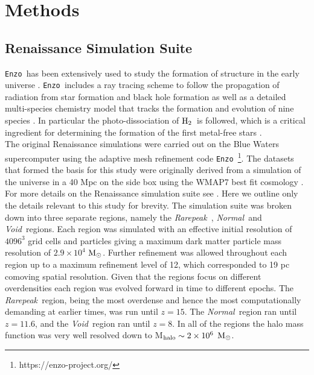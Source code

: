 \documentclass[graphics, twocolumn, usenatbib]{mn2e}
\newcommand{\enzo}{\texttt{Enzo~}}
\newcommand{\msolarc} {$\rm{M_{\odot}}$}
\newcommand{\molH} {$\rm{H_2}$~}
\newcommand{\rarepeak} {\textit{Rarepeak~}}
\newcommand{\normal} {\textit{Normal~}}
\newcommand{\void} {\textit{Void~}}
\begin{document}
\section{Methods} \label{Sec:Methods}


\subsection{Renaissance Simulation Suite} \label{Sec:Renaissance}
\enzo has been extensively used to study the formation of structure in the early universe
\citep{Abel_2002, OShea_2005b, Turk_2012, Wise_2012b, Wise_2014, Regan_2015, Regan_2017}.
\enzo includes a ray tracing scheme to follow the propagation of radiation from
star formation and black hole formation \citep{WiseAbel_2011} as well as a detailed multi-species
chemistry model that tracks the formation and evolution of nine species \citep{Anninos_1997,
  Abel_1997}. In particular the photo-dissociation of \molH is followed, which is a critical
ingredient for determining the formation of the first metal-free stars \citep{Abel_2000}.\\
\indent The original Renaissance simulations were carried out on the Blue Waters supercomputer 
using the adaptive mesh refinement code \enzo\citep{Enzo_2014, Enzo_2019}\footnote{https://enzo-project.org/}.
The datasets that formed the basis for this study were originally derived from a simulation of the
universe in a 40 Mpc on the side box using the WMAP7 best fit cosmology \citep{Komatsu_2011}.
For more details on the Renaissance simulation suite see \cite{Chen_2014}. Here we outline only
the details relevant to this study for brevity. The simulation suite was broken down into
three separate regions, namely the \rarepeak, \normal and \void regions. Each region was simulated with
an effective initial resolution of $4096^3$ grid cells and particles giving a maximum dark matter
particle mass resolution of $2.9 \times 10^4$ \msolarc. Further refinement was allowed throughout
each region up to a maximum refinement level of 12, which corresponded to 19 pc comoving spatial resolution.
Given that the regions focus on different
 overdensities each region was evolved forward in time to different epochs. The \rarepeak region,
 being the most overdense and hence the most computationally demanding at earlier times, was run
 until $z = 15$. The \normal region ran until $z = 11.6$, and the \void region ran until $z = 8$. In all
 of the regions the halo mass function was very well resolved down to M$_{\rm halo} \sim 2 \times 10^6$
 \msolarc. \\
\end{document}
